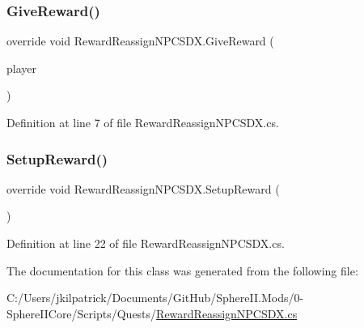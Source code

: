 \subsubsection{\texorpdfstring{GiveReward()}{GiveReward()}}
{\footnotesize\ttfamily override void Reward\+Reassign\+N\+P\+C\+S\+D\+X.\+Give\+Reward (\begin{DoxyParamCaption}\item[{Entity\+Player}]{player }\end{DoxyParamCaption})}



Definition at line 7 of file Reward\+Reassign\+N\+P\+C\+S\+D\+X.\+cs.

\mbox{\label{class_reward_reassign_n_p_c_s_d_x_ae7d0652d2c3443333ef0e7fbff2dd27c}} 
\subsubsection{\texorpdfstring{SetupReward()}{SetupReward()}}
{\footnotesize\ttfamily override void Reward\+Reassign\+N\+P\+C\+S\+D\+X.\+Setup\+Reward (\begin{DoxyParamCaption}{ }\end{DoxyParamCaption})}



Definition at line 22 of file Reward\+Reassign\+N\+P\+C\+S\+D\+X.\+cs.



The documentation for this class was generated from the following file\+:\begin{DoxyCompactItemize}
\item 
C\+:/\+Users/jkilpatrick/\+Documents/\+Git\+Hub/\+Sphere\+I\+I.\+Mods/0-\/\+Sphere\+I\+I\+Core/\+Scripts/\+Quests/\mbox{\hyperlink{_reward_reassign_n_p_c_s_d_x_8cs}{Reward\+Reassign\+N\+P\+C\+S\+D\+X.\+cs}}\end{DoxyCompactItemize}
